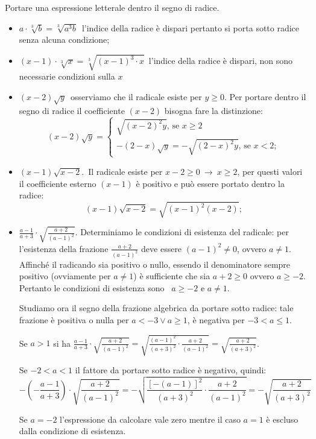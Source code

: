  \begin{esempio}
 Portare una espressione letterale dentro il segno di radice.
 \begin{itemize}
 \item $a\cdot \sqrt[3]b=\sqrt[3]{a^3b}$\, l'indice della radice è dispari 
  pertanto si porta sotto radice senza alcuna condizione;
 \item $(x-1)\cdot \sqrt[3]x=\sqrt[3]{(x-1)^3\cdot x}$\, l'indice della 
radice 
  è dispari, non sono necessarie condizioni sulla $x$
 \item $(x-2)\sqrt y$\, osserviamo che il radicale esiste per $y\ge 0$.
  Per portare dentro il segno di radice il coefficiente $(x-2)$ bisogna 
fare 
  la distinzione:
 \[
 (x-2)\sqrt y=\left\{\begin{array}{l}\sqrt{(x-2)^2y}\text{, se }x\ge 2\\
 -(2-x)\sqrt y=-\sqrt{(2-x)^2y}\text{, se }x<2;\end{array}\right.
 \]
 \item $(x-1)\sqrt{x-2}$.\, Il radicale esiste per $x-2\ge 0\ \to \ x\ge 
2$, 
 per questi valori il coefficiente esterno $(x-1)$ è positivo e può essere 
 portato dentro la radice: \[(x-1)\sqrt{x-2}=\sqrt{(x-1)^2(x-2)};\]
 \item $\frac{a-1}{a+3}\cdot \sqrt{\frac{a+2}{(a-1)^2}}$. Determiniamo le 
 condizioni di esistenza del radicale: per l'esistenza della frazione 
 $\frac{a+2}{(a-1)^2}$ deve essere $(a-1)^2\neq 0$, ovvero $a\neq 1$. 
 Affinché il radicando sia positivo o nullo, essendo il denominatore 
sempre positivo (ovviamente per $a\neq 1$) è sufficiente che sia 
$a+2\geqslant 0$ ovvero $a\geqslant -2$. 
 Pertanto le condizioni di esistenza sono~ $a\geqslant -2$ e $a\neq 1$.

 Studiamo ora il segno della frazione algebrica da portare sotto radice: 
 tale frazione è positiva o nulla per $a<-3\vee a\geqslant 1$, è negativa 
 per $-3<a\leqslant 1$.

 Se $a>1$ si ha 
 $\frac{a-1}{a+3}\cdot \sqrt{\frac{a+2}{(a-1)^2}}=
  \sqrt{\frac{(a-1)^2}{(a+3)^2}\cdot \frac{a+2}{(a-1)^2}}=
  \sqrt{\frac{a+2}{(a+3)^2}}$.

 Se $-2<a<1$ il fattore da portare sotto radice è negativo, quindi:
 \[-\left(-\frac{a-1}{a+3}\right)\cdot \sqrt{\frac{a+2}{(a-1)^2}}=
   -\sqrt{\frac{[-(a-1)]^2}{(a+3)^2}\cdot \frac{a+2}{(a-1)^2}}=
   -\sqrt{\frac{a+2}{(a+3)^2}}\]

 Se $a=-2$ l'espressione da calcolare vale zero mentre il caso $a=1$ è 
escluso  dalla condizione di esistenza.
 \end{itemize}
 \end{esempio}

